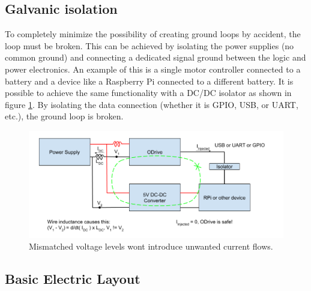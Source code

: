     \subsection{Galvanic isolation}
    
    To completely minimize the possibility of creating ground loops by accident, the loop must be broken. This can be achieved by isolating the power supplies (no common ground) and connecting a dedicated signal ground between the logic and power electronics. An example of this is a single motor controller connected to a battery and a device like a Raspberry Pi connected to a different battery. It is possible to achieve the same functionality with a DC/DC isolator as shown in figure \ref{ground_loop_fix}. By isolating the data connection (whether it is GPIO, USB, or UART, etc.), the ground loop is broken.
    
    \begin{figure}[h]
    \includegraphics[width=\textwidth]{contents/figures/ground_loop_fix.png}
    \caption{Mismatched voltage levels wont introduce unwanted current flows.}
    \label{ground_loop_fix}
    \end{figure}

    \clearpage
    
    \subsection{Basic Electric Layout}


